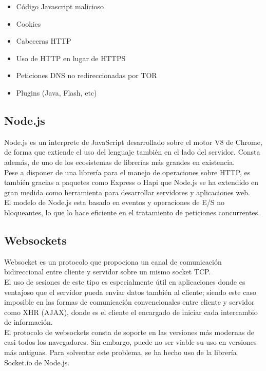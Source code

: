 \begin{itemize}  
	\item  Código Javascript malicioso
	\item  Cookies
	\item  Cabeceras HTTP
	\item  Uso de HTTP en lugar de HTTPS
	\item Peticiones DNS no redireccionadas por TOR
	\item  Plugins (Java, Flash, etc)
\end{itemize}

\subsection {Node.js}

Node.js es un interprete de JavaScript desarrollado sobre el motor V8 de Chrome, de forma que extiende el uso del lenguaje también en el lado del servidor. Consta además, de uno de los ecosistemas de librerías más grandes en existencia. \\

Pese a disponer de una librería para el manejo de operaciones sobre HTTP, es también gracias a paquetes como Express o Hapi que Node.js se ha extendido en gran medida como herramienta para desarrollar servidores y aplicaciones web. \\
El modelo de Node.js esta basado en eventos y operaciones de E/S no bloqueantes, lo que lo hace eficiente en el tratamiento de peticiones concurrentes.

\subsection {Websockets}

Websocket es un protocolo que propociona un canal de comunicación bidireccional entre cliente y servidor sobre un mismo socket TCP. \\

El uso de sesiones de este tipo es especialmente útil en aplicaciones donde es ventajoso que el servidor pueda enviar datos también al cliente; siendo este caso imposible en las formas de comunicación convencionales entre cliente y servidor como XHR (AJAX), donde es el cliente el encargado de iniciar cada intercambio de información. \\

El protocolo de websockets consta de soporte en las versiones más modernas de casi todos los navegadores. Sin embargo, puede no ser viable su uso en versiones más antiguas. Para solventar este problema, se ha hecho uso de la librería Socket.io de Node.js. \\


